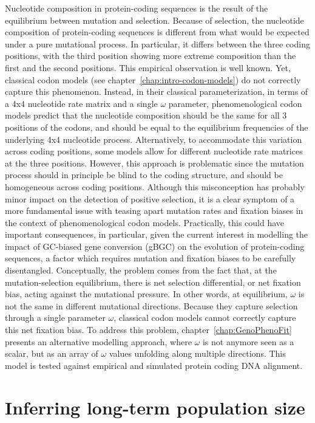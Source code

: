 Nucleotide composition in protein-coding sequences is the result of the equilibrium between mutation and selection.
Because of selection, the nucleotide composition of protein-coding sequences is different from what would be expected under a pure mutational process.
In particular, it differs between the three coding positions, with the third position showing more extreme composition than the first and the second positions.
This empirical observation is well known.
Yet, classical codon models (see chapter~\ref{chap:intro-codon-models}) do not correctly capture this phenomenon.
Instead, in their classical parameterization, in terms of a 4x4 nucleotide rate matrix and a single $\omega$ parameter, phenomenological codon models predict that the nucleotide composition should be the same for all $3$ positions of the codons, and should be equal to the equilibrium frequencies of the underlying 4x4 nucleotide process.
Alternatively, to accommodate this variation across coding positions, some models allow for different nucleotide rate matrices at the three positions.
However, this approach is problematic since the mutation process should in principle be blind to the coding structure, and should be homogeneous across coding positions.
Although this misconception has probably minor impact on the detection of positive selection, it is a clear symptom of a more fundamental issue with teasing apart mutation rates and fixation biases in the context of phenomenological codon models.
Practically, this could have important consequences, in particular, given the current interest in modelling the impact of GC-biased gene conversion (gBGC) on the evolution of protein-coding sequences, a factor which requires mutation and fixation biases to be carefully disentangled.
Conceptually, the problem comes from the fact that, at the mutation-selection equilibrium, there is net selection differential, or net fixation bias, acting against the mutational pressure.
In other words, at equilibrium, $\omega$ is not the same in different mutational directions.
Because they capture selection through a single parameter $\omega$, classical codon models cannot correctly capture this net fixation bias.
To address this problem, chapter~\ref{chap:GenoPhenoFit} presents an alternative modelling approach, where $\omega$ is not anymore seen as a scalar, but as an array of $\omega$ values unfolding along multiple directions.
This model is tested against empirical and simulated protein coding DNA alignment.

\section{Inferring long-term population size}
\label{sec-goals:MutSelDrift}

